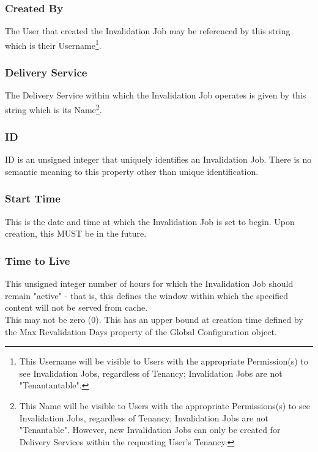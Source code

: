 \subsubsection{Created By}
The User that created the Invalidation Job may be referenced by this string
which is their Username\footnote{This Username will be visible to Users with the
appropriate Permission(s) to see Invalidation Jobs, regardless of Tenancy;
Invalidation Jobs are not "Tenantantable".}.

\subsubsection{Delivery Service}
The Delivery Service within which the Invalidation Job operates is given by this
string which is its Name\footnote{This Name will be visible to Users with the
appropriate Permissions(s) to see Invalidation Jobs, regardless of Tenancy;
Invalidation Jobs are not "Tenantable". However, new Invalidation Jobs can only
be created for Delivery Services within the requesting User's Tenancy.}.

\subsubsection{ID}
ID is an unsigned integer that uniquely identifies an Invalidation Job. There is
no semantic meaning to this property other than unique identification.

\subsubsection{Start Time}
This is the date and time at which the Invalidation Job is set to begin. Upon
creation, this MUST be in the future.

\subsubsection{Time to Live}
This unsigned integer number of hours for which the Invalidation Job should
remain "active" - that is, this defines the window within which the specified
content will not be served from cache.\\
This may not be zero ($0$). This has an upper bound at creation time defined by
the Max Revalidation Days property of the Global Configuration object.
